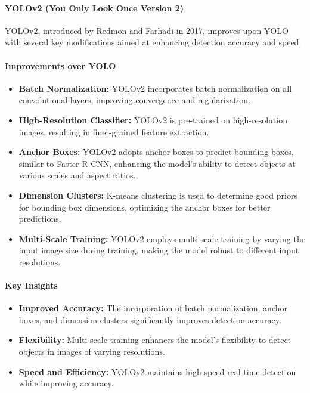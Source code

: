 \documentclass[12pt]{article}
\begin{document}
\paragraph{YOLOv2 (You Only Look Once Version 2)}

YOLOv2, introduced by Redmon and Farhadi in 2017, improves upon YOLO with several key modifications aimed at enhancing detection accuracy and speed.

\paragraph{Improvements over YOLO}

\begin{itemize}
    \item \textbf{Batch Normalization:} YOLOv2 incorporates batch normalization on all convolutional layers, improving convergence and regularization.

    \item \textbf{High-Resolution Classifier:} YOLOv2 is pre-trained on high-resolution images, resulting in finer-grained feature extraction.

    \item \textbf{Anchor Boxes:} YOLOv2 adopts anchor boxes to predict bounding boxes, similar to Faster R-CNN, enhancing the model's ability to detect objects at various scales and aspect ratios.

    \item \textbf{Dimension Clusters:} K-means clustering is used to determine good priors for bounding box dimensions, optimizing the anchor boxes for better predictions.

    \item \textbf{Multi-Scale Training:} YOLOv2 employs multi-scale training by varying the input image size during training, making the model robust to different input resolutions.
\end{itemize}

\paragraph{Key Insights}

\begin{itemize}
    \item \textbf{Improved Accuracy:} The incorporation of batch normalization, anchor boxes, and dimension clusters significantly improves detection accuracy.

    \item \textbf{Flexibility:} Multi-scale training enhances the model's flexibility to detect objects in images of varying resolutions.

    \item \textbf{Speed and Efficiency:} YOLOv2 maintains high-speed real-time detection while improving accuracy.
\end{itemize}
\end{document}
